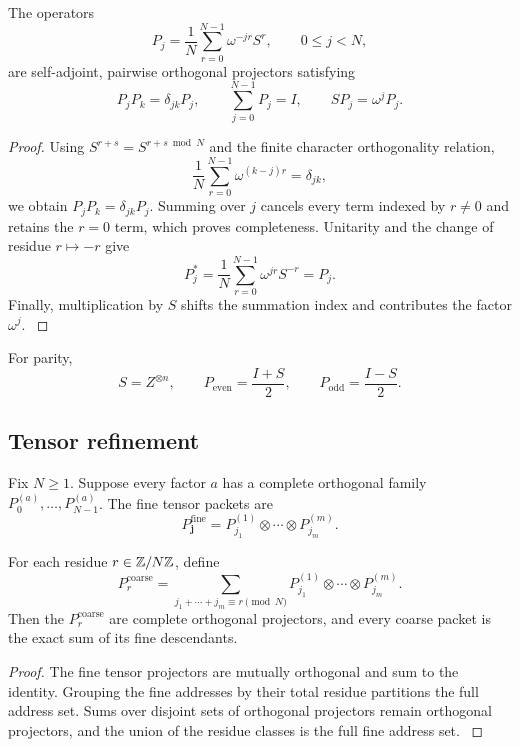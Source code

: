 \begin{theorem}\label{core:theorem:004}\label{core:thm:cyclic}
The operators
\[
\boxed{
P_j
=
\frac1N\sum_{r=0}^{N-1}\omega^{-jr}S^r,
\qquad
0\le j<N,
}
\]
are self-adjoint, pairwise orthogonal projectors satisfying
\[
P_jP_k=\delta_{jk}P_j,
\qquad
\sum_{j=0}^{N-1}P_j=I,
\qquad
SP_j=\omega^jP_j.
\]
\end{theorem}

\begin{proof}\label{core:proof:005}
Using $S^{r+s}=S^{r+s\bmod N}$ and the finite character orthogonality relation,
\[
\frac1N\sum_{r=0}^{N-1}\omega^{(k-j)r}=\delta_{jk},
\]
we obtain $P_jP_k=\delta_{jk}P_j$. Summing over $j$ cancels every term indexed by $r\ne0$ and retains the $r=0$ term, which proves completeness. Unitarity and the change of residue $r\mapsto-r$ give
\[
P_j^*=\frac1N\sum_{r=0}^{N-1}\omega^{jr}S^{-r}=P_j.
\]
Finally, multiplication by $S$ shifts the summation index and contributes the factor $\omega^j$.
\label{core:proof:005:end}\end{proof}

For parity,
\[
S=Z^{\otimes n},
\qquad
P_{\mathrm{even}}=\frac{I+S}{2},
\qquad
P_{\mathrm{odd}}=\frac{I-S}{2}.
\]

\subsection{Tensor refinement}

Fix $N\ge1$. Suppose every factor $a$ has a complete orthogonal family $P^{(a)}_0,\ldots,P^{(a)}_{N-1}$. The fine tensor packets are
\[
P_{\mathbf j}^{\mathrm{fine}}
=
P^{(1)}_{j_1}\otimes\cdots\otimes P^{(m)}_{j_m}.
\]

\begin{theorem}\label{core:theorem:005}\label{core:thm:tensor}
For each residue $r\in\bbZ/N\bbZ$, define
\[
\boxed{
P_r^{\mathrm{coarse}}
=
\sum_{j_1+\cdots+j_m\equiv r\pmod N}
P^{(1)}_{j_1}\otimes\cdots\otimes P^{(m)}_{j_m}.
}
\]
Then the $P_r^{\mathrm{coarse}}$ are complete orthogonal projectors, and every coarse packet is the exact sum of its fine descendants.
\end{theorem}

\begin{proof}\label{core:proof:006}
The fine tensor projectors are mutually orthogonal and sum to the identity. Grouping the fine addresses by their total residue partitions the full address set. Sums over disjoint sets of orthogonal projectors remain orthogonal projectors, and the union of the residue classes is the full fine address set.
\label{core:proof:006:end}\end{proof}

